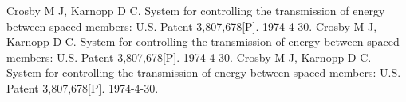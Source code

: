 \documentclass[openright,oneside]{ctexbook}	%
\begin{document}
	
	\makeatletter
	\def\@cite#1#2{\textsuperscript{[{#1\if@tempswa , #2\fi}]}}				%
	\makeatother



\vspace{2\baselineskip}

{\renewcommand\baselinestretch{1}\selectfont
\tableofcontents \par } 		\clearpage

 

 \songti	

 

% 

% 

% 

%
%

\begin{thebibliography}{99}
 Crosby M J, Karnopp D C. System for controlling the transmission of energy between spaced members: U.S. Patent 3,807,678[P]. 1974-4-30.
 Crosby M J, Karnopp D C. System for controlling the transmission of energy between spaced members: U.S. Patent 3,807,678[P]. 1974-4-30.
 Crosby M J, Karnopp D C. System for controlling the transmission of energy between spaced members: U.S. Patent 3,807,678[P]. 1974-4-30.
\end{thebibliography}
\end{document}
